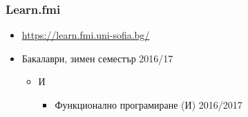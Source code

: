 \documentclass{beamer}
\begin{document}
\begin{frame}
  \frametitle{Learn.fmi}
  
  \begin{itemize}
  \item \url{https://learn.fmi.uni-sofia.bg/}
  \item Бакалаври, зимен семестър 2016/17
    \begin{itemize}
    \item И
      \begin{itemize}
      \item Функционално програмиране (И) 2016/2017
      \end{itemize}
    \end{itemize}
  \end{itemize}
\end{frame}
\end{document}

